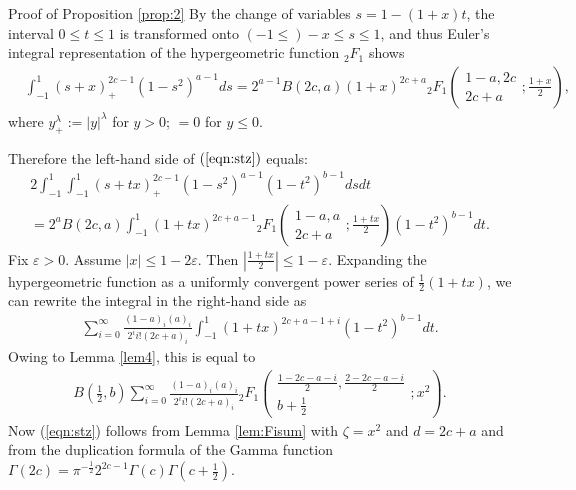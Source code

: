 \documentclass[12pt]{article}
\numberwithin{equation}{section}
\newcommand{\assign}{:=}
\newenvironment{proof*}[1]{\noindent{\textit{#1.\ }}}{\hspace*{\fill}$\Box$\medskip}
\newcommand{\mygrammarfootnote}[1]{}
\begin{document}
\begin{proof*}{Proof of Proposition \ref{prop:2}}
  By the change of variables $s = 1 - (1 + x) t$, the interval $0 \leqslant t
  \leqslant 1$ is transformed onto $(- 1 \leqslant) - x \leqslant s \leqslant
  1$, and thus Euler's integral representation of the hypergeometric function
  $_2 F_1$ shows
  \begin{eqnarray}
    & \displaystyle\int_{- 1}^1 (s + x)_+^{2 c - 1} (1 - s^2)^{a - 1} d s = 2^{a - 1} B (2
    c, a) (1 + x)^{2 c + a}{}_2 F_1 \left( \begin{array}{c}
      1 - a, 2 c\\
      2 c + a
    \end{array} ; \frac{1 + x}{2} \right), &  \nonumber
  \end{eqnarray}
  where $y_+^{\lambda} \assign | y |^{\lambda}$ for $y > 0$; $= 0$ for $y
  \leqslant 0$.
  
  Therefore the left-hand side of $(\ref{eqn:stz})$ equals:
  \begin{multline}
     2 \displaystyle\int_{- 1}^1 \displaystyle\int_{- 1}^1 (s + tx)_+^{2 c - 1} (1 - s^2)^{a - 1} (1 -
    t^2)^{b - 1} d s d t   \\
     = 2^a B (2 c, a) \displaystyle\int_{- 1}^1 (1 + tx)^{2 c + a - 1}{}_2 F_1 \left(
    \begin{array}{c}
      1 - a, a\\
      2 c + a
    \end{array} ; \frac{1 + tx}{2} \right) (1 - t^2)^{b - 1} d t.   
	  \nonumber
  \end{multline}
  Fix $\varepsilon > 0$. Assume $| x | \leqslant 1 - 2 \varepsilon$. Then
  $\left| \frac{1 + tx}{2} \right| \leqslant 1 - \varepsilon$. Expanding the
  hypergeometric function as a uniformly convergent power series of
  $\frac{1}{2} (1 + tx)$, we can rewrite the integral in the right-hand side
  as
  \begin{eqnarray}
    & \displaystyle\sum_{i = 0}^{\infty} \frac{(1 - a)_i (a)_i}{2^i i! (2 c + a)_i}
    \displaystyle\int_{- 1}^1 (1 + t x)^{2 c + a - 1 + i} (1 - t^2)^{b - 1} d t. & 
    \nonumber
  \end{eqnarray}
  Owing to Lemma \ref{lem4}, this is equal to
  \begin{eqnarray}
    & B \left( \frac{1}{2}, b \right) \displaystyle\sum_{i = 0}^{\infty} \frac{(1 - a)_i
    (a)_i}{2^i i! (2 c + a)_i}{}_2 F_1 \left( \begin{array}{c}
      \displaystyle\frac{1 - 2 c - a - i}{2}, \frac{2 - 2 c - a - i}{2}\\
      b + \frac{1}{2}
    \end{array} ; x^2 \right) . &  \nonumber
  \end{eqnarray}
  Now (\ref{eqn:stz}) follows from Lemma \ref{lem:Fisum} with $\zeta = x^2$
  and $d = 2 c + a$\mygrammarfootnote{maybe, we need a comma here?} and from the
  duplication formula of the Gamma function $\Gamma (2 c) = \pi^{-
  \frac{1}{2}} 2^{2 c - 1} \Gamma (c) \Gamma \left( c + \frac{1}{2} \right)$.
\end{proof*}
\end{document}

